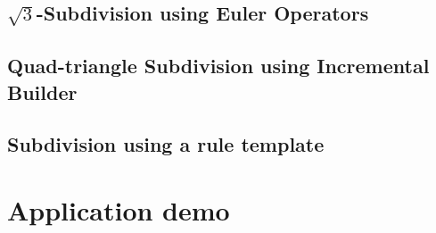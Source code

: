 \documentclass[letter,twoside,10pt]{article}
\begin{document}
\subsection{$\sqrt{3}$-Subdivision using Euler Operators}
%

\subsection{Quad-triangle Subdivision using Incremental Builder}
\label{sec:subdivision_builder}
%

\subsection{Subdivision using a rule template}
\label{sec:subdivision_rule}
%

\section{Application demo}
%




\end{document}
